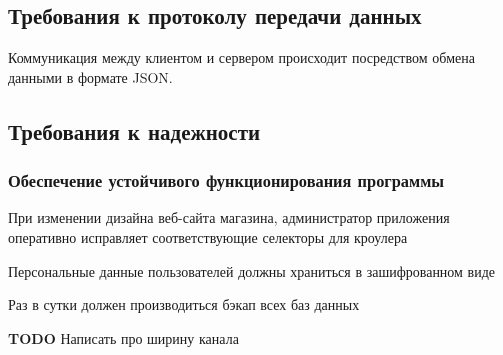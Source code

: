 \subsection{Требования к протоколу передачи данных}

Коммуникация между клиентом и сервером происходит посредством обмена данными в формате JSON.

\subsection{Требования к надежности}
\subsubsection{Обеспечение устойчивого функционирования программы}
\begin{my_enumerate}
\item При изменении дизайна веб-сайта магазина, администратор приложения оперативно
исправляет соответствующие селекторы для кроулера
\item Персональные данные пользователей должны храниться в зашифрованном виде
\item Раз в сутки должен производиться бэкап всех баз данных
\end{my_enumerate}
\textbf{TODO} Написать про ширину канала \\
